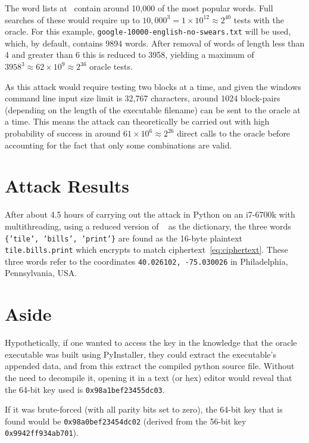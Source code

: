 \documentclass[11pt]{article}
\begin{document}
    The word lists at~\cite{attack_dictionary} contain around 10,000 of the most popular words.
    Full searches of these would require up to $10,000^3 = 1\times10^{12} \approx 2^{40}$ tests with the oracle.
    For this example, \texttt{google-10000-english-no-swears.txt} will be used, which, by default, contains 9894 words.
    After removal of words of length less than 4 and greater than 6 this is reduced to 3958, yielding a maximum of $3958^3 \approx 62\times10^{9} \approx 2^{36}$ oracle tests.

    As this attack would require testing two blocks at a time, and given the windows command line input size limit is 32,767 characters, around 1024 block-pairs (depending on the length of the executable filename) can be sent to the oracle at a time.
    This means the attack can theoretically be carried out with high probability of success in around $61\times10^6 \approx 2^{26}$ direct calls to the oracle before accounting for the fact that only some combinations are valid.


    \section{Attack Results}\label{sec:attack-results}
    After about 4.5 hours of carrying out the attack in Python on an i7-6700k with multithreading, using a reduced version of ~\cite{attack_dictionary} as the dictionary, the three words \texttt{\{'tile', 'bills', 'print'\}} are found as the 16-byte plaintext \texttt{tile.bills.print} which encrypts to match ciphertext~\eqref{eq:ciphertext}.
    These three words refer to the coordinates \texttt{40.026102, -75.030026} in Philadelphia, Pennsylvania, USA\@.


    \section{Aside}\label{sec:asside}
    Hypothetically, if one wanted to access the key in the knowledge that the oracle executable was built using PyInstaller, they could extract the executable's appended data, and from this extract the compiled python source file.
    Without the need to decompile it, opening it in a text (or hex) editor would reveal that the 64-bit key used is \texttt{0x98a1bef23455dc03}.

    If it was brute-forced (with all parity bits set to zero), the 64-bit key that is found would be \texttt{0x98a0bef23454dc02} (derived from the 56-bit key \texttt{0x9942ff934ab701}).


    
    
\end{document}

